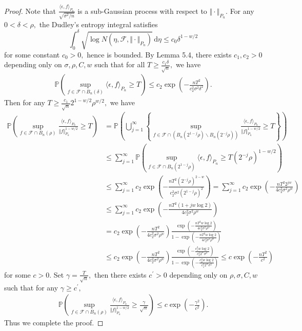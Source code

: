 \documentclass{article}
\begin{document}
\begin{proof}
Note that
$\frac{\langle\epsilon,f\rangle_{P_n}}{\sqrt{{\sigma^2}/{n}}}$ is a sub-Gaussian process with respect to $\Vert\cdot\Vert_{P_n}$.
For any $0<\delta <\rho,$ the Dudley's entropy integral satisfies
\begin{equation*}
  \int_0^{\delta}\sqrt{\log N(\eta,\mathcal{F},\Vert\cdot\Vert_{P_n})}\,\mathrm{d}\eta\leq c_0\delta^{1-w/2}\tag{5.29}
\end{equation*}
for some constant $c_0 > 0,$ hence is bounded. By Lemma 5.4, there exists $c_1,c_2>0$ depending only on $\sigma,\rho,C,w$ such that for all $T\geq \frac{c_1\delta}{\sqrt{n}},$ we have
\begin{align*}
	\mathbb{P}\left(\sup_{f\in\mathcal{F}\cap B_n(\delta)}\langle\epsilon,f\rangle_{P_n} \geq T\right)\leq c_2\exp\left(-\frac{nT^2}{c_2^2\sigma^2\delta^2}\right).\tag{5.30}
\end{align*}
Then for any $T\geq \frac{c_1}{\sqrt{n}}2^{1-w/2}\rho^{w/2},$ we have
\begin{align*}
	\mathbb{P}\left(\sup_{f\in\mathcal{F}\cap B_n(\rho)}\frac{\langle\epsilon,f\rangle_{P_n}}{\Vert f\Vert_{P_n}^{1-w/2}} \geq T\right)
	&= \mathbb{P}\left(\bigcup_{j=1}^\infty\left\{\sup_{f\in\mathcal{F}\cap (B_n(2^{1-j}\rho)\backslash B_n(2^{-j}\rho) )}\frac{\langle\epsilon,f\rangle_{P_n}}{\Vert f\Vert_{P_n}^{1-w/2}} \geq T\right\}\right)\\
	&\leq\sum_{j=1}^\infty\mathbb{P}\left(\sup_{f\in\mathcal{F}\cap B_n(2^{1-j}\rho)}\langle\epsilon,f\rangle_{P_n}\geq T(2^{-j}\rho)^{1-w/2}\right)\\
	&\leq \sum_{j=1}^\infty c_2\exp\left(-\frac{nT^2(2^{-j}\rho)^{2-w}}{c_2^2\sigma^2(2^{1-j}\rho)^2}\right) = \sum_{j=1}^\infty c_2\exp\left(-\frac{nT^2 2^{jw}}{4c_2^2\sigma^2\rho^w}\right)\\
	&\leq \sum_{j=1}^\infty c_2\exp\left(-\frac{nT^2 (1 + jw\log 2)}{4c_2^2\sigma^2\rho^w}\right)\\ &=c_2\exp\left(-\frac{nT^2}{4c_2^2\sigma^2\rho^w}\right)\frac{\exp\left(-\frac{nT^2w\log 2}{4c_2^2\sigma^2\rho^w}\right)}{1 - \exp\left(-\frac{nT^2w\log 2}{4c_2^2\sigma^2\rho^w}\right)}\\
	&\leq c_2\exp\left(-\frac{nT^2}{4c_2^2\sigma^2\rho^w}\right)\frac{\exp\left(-\frac{c_1^2 w\log 2}{c_2^2 2^w\sigma^2}\right)}{1-\exp\left(-\frac{c_2^2 w\log 2}{c_1^2 2^w\sigma^2}\right)} \leq c\exp\left(-\frac{nT^2}{c^2}\right)\tag{5.31}
\end{align*}
for some $c>0.$ Set $\gamma = \frac{T}{\sqrt{n}},$ then there exists $c^\prime>0$ depending only on $\rho,\sigma,C,w$ such that for any $\gamma \geq c^\prime,$
\begin{align*}
	\mathbb{P}\left(\sup_{f\in\mathcal{F}\cap B_n(\rho)}\frac{\langle\epsilon,f\rangle_{P_n}}{\Vert f\Vert_{P_n}^{1-w/2}} \geq \frac{\gamma}{\sqrt{n}}\right) \leq c\exp\left(-\frac{\gamma^2}{c^2}\right).\tag{5.32}
\end{align*}
Thus we complete the proof.
\end{proof}
\end{document}
